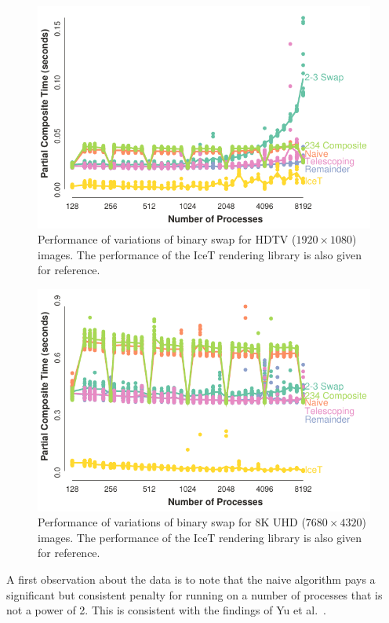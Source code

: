\documentclass{vgtc}                          %
\newcommand*{\scite}[1]{~\cite{#1}}
\newcommand{\textalgorithm}[1]{\textsf{#1}\xspace}
\newcommand{\binaryswap}{\textalgorithm{binary swap}}
\begin{document}
\begin{figure}
  \centering
  \includegraphics[width=\linewidth]{scaling-hdtv}
  \caption{
    Performance of variations of \binaryswap for HDTV ($1920 \times 1080$) images.
    The performance of the IceT rendering library is also given for reference.
  }
  \label{fig:ScalingHDTV}
\end{figure}

\begin{figure}
  \centering
  \includegraphics[width=\linewidth]{scaling-8k}
  \caption{
    Performance of variations of \binaryswap for 8K UHD ($7680 \times 4320$) images.
    The performance of the IceT rendering library is also given for reference.
  }
  \label{fig:Scaling8K}
\end{figure}

A first observation about the data is to note that the naive algorithm pays a significant but consistent penalty for running on a number of processes that is not a power of 2.
This is consistent with the findings of Yu et al.\scite{23Swap}.
\end{document}
